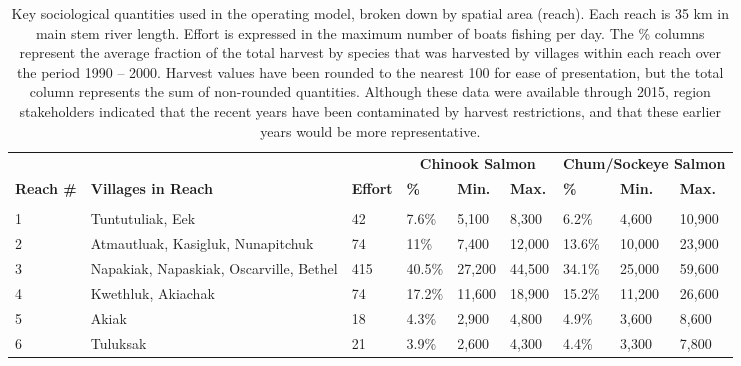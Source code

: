 \documentclass[12pt,]{book}
\theoremstyle{definition}
\theoremstyle{definition}
\theoremstyle{definition}
\theoremstyle{remark}
\begin{document}
\begin{landscape}\begin{table}

\caption{\label{tab:socio-spatial-table}Key sociological quantities used in the operating model, broken down by spatial area (reach). Each reach is 35 km in main stem river length. Effort is expressed in the maximum number of boats fishing per day. The \% columns represent the average fraction of the total harvest by species that was harvested by villages within each reach over the period 1990 -- 2000. Harvest values have been rounded to the nearest 100 for ease of presentation, but the total column represents the sum of non-rounded quantities. Although these data were available through 2015, region stakeholders indicated that the recent years have been contaminated by harvest restrictions, and that these earlier years would be more representative.}
\centering
\begin{tabular}[t]{lllllllll}
\toprule
\multicolumn{1}{c}{\bfseries } & \multicolumn{1}{c}{\bfseries } & \multicolumn{1}{c}{\bfseries } & \multicolumn{3}{c}{\bfseries Chinook Salmon} & \multicolumn{3}{c}{\bfseries Chum/Sockeye Salmon} \\
\cmidrule(l{2pt}r{2pt}){4-6} \cmidrule(l{2pt}r{2pt}){7-9}
\textbf{Reach \#} & \textbf{Villages in Reach} & \textbf{Effort} & \textbf{\%} & \textbf{Min.} & \textbf{Max.} & \textbf{\%} & \textbf{Min.} & \textbf{Max.}\\
\midrule
\addlinespace[0.3em]
\multicolumn{9}{l}{\textbf{Lower River}}\\
\hline
\hspace{1em}1 & Tuntutuliak, Eek & 42 & 7.6\% & 5,100 & 8,300 & 6.2\% & 4,600 & 10,900\\
\hspace{1em}2 & Atmautluak, Kasigluk, Nunapitchuk & 74 & 11\% & 7,400 & 12,000 & 13.6\% & 10,000 & 23,900\\
\hspace{1em}3 & Napakiak, Napaskiak, Oscarville, Bethel & 415 & 40.5\% & 27,200 & 44,500 & 34.1\% & 25,000 & 59,600\\
\hspace{1em}4 & Kwethluk, Akiachak & 74 & 17.2\% & 11,600 & 18,900 & 15.2\% & 11,200 & 26,600\\
\hspace{1em}5 & Akiak & 18 & 4.3\% & 2,900 & 4,800 & 4.9\% & 3,600 & 8,600\\
\hspace{1em}6 & Tuluksak & 21 & 3.9\% & 2,600 & 4,300 & 4.4\% & 3,300 & 7,800\\

\end{tabular}
\end{table}
\end{landscape}
\end{document}
